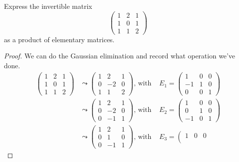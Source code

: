 \begin{exercise} \label{exercise 3.2.7}
Express the invertible matrix
\[
    \begin{pmatrix} 1 & 2 & 1 \\ 1 & 0 & 1 \\ 1 & 1 & 2 \end{pmatrix}
\]
as a product of elementary matrices.
\end{exercise}

\begin{proof}
We can do the Gaussian elimination and record what operation we've done.
\begin{align*}
    \left(\begin{array}{lll}
        1 & 2 & 1 \\
        1 & 0 & 1 \\
        1 & 1 & 2
    \end{array}\right)
    & \leadsto
    \left(\begin{array}{ccc}
        1 & 2 & 1 \\
        0 & -2 & 0 \\
        1 & 1 & 2
    \end{array}\right)
    \text{, with } & E_1 = \left(\begin{array}{ccc}
        1 & 0 & 0 \\
        -1 & 1 & 0 \\
        0 & 0 & 1
    \end{array}\right) \\
    & \leadsto
        \left(\begin{array}{ccc}
        1 & 2 & 1 \\
        0 & -2 & 0 \\
        0 & -1 & 1
    \end{array}\right)
    \text{, with } & E_2 = \left(\begin{array}{ccc}
        1 & 0 & 0 \\
        0 & 1 & 0 \\
        -1 & 0 & 1
    \end{array}\right) \\
    & \leadsto
        \left(\begin{array}{ccc}
        1 & 2 & 1 \\
        0 & 1 & 0 \\
        0 & -1 & 1
    \end{array}\right)
    \text{, with } & E_3 = \left(\begin{array}{ccc}
        1 & 0 & 0 \\

\end{array}
\end{align*}
\end{proof}
